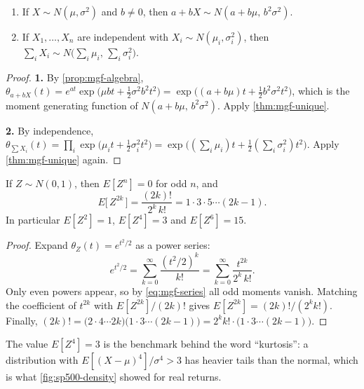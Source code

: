 \begin{corollary}\label{cor:normal-closure}
	\begin{enumerate}[nosep]
		\item If $X\sim N(\mu,\sigma^{2})$ and $b\ne0$, then $a+bX\sim N(a+b\mu,\,b^{2}\sigma^{2})$.
		\item If $X_{1},\dots,X_{n}$ are independent with $X_{i}\sim N(\mu_{i},\sigma_{i}^{2})$, then
		      $\sum_{i}X_{i}\sim N\bigl(\sum_{i}\mu_{i},\,\sum_{i}\sigma_{i}^{2}\bigr)$.
	\end{enumerate}
\end{corollary}

\begin{proof}
	\textbf{1.} By \autoref{prop:mgf-algebra},
	$\theta_{a+bX}(t)=e^{at}\exp\bigl(\mu bt+\tfrac12\sigma^{2}b^{2}t^{2}\bigr)=\exp\bigl((a+b\mu)t+\tfrac12 b^{2}\sigma^{2}t^{2}\bigr)$,
	which is the moment generating function of $N(a+b\mu,\,b^{2}\sigma^{2})$.
	Apply \autoref{thm:mgf-unique}.

	\textbf{2.} By independence,
	$\theta_{\sum X_{i}}(t)=\prod_{i}\exp\bigl(\mu_{i}t+\tfrac12\sigma_{i}^{2}t^{2}\bigr)=\exp\bigl((\sum_{i}\mu_{i})t+\tfrac12(\sum_{i}\sigma_{i}^{2})t^{2}\bigr)$.
	Apply \autoref{thm:mgf-unique} again.
\end{proof}

\begin{corollary}\label{cor:normal-moments}
	If $Z\sim N(0,1)$, then $E[Z^{n}]=0$ for odd $n$, and
	\[
		E\bigl[\,Z^{2k}\,\bigr] = \frac{(2k)!}{2^{k}\,k!} = 1\cdot3\cdot5\cdots(2k-1) .
	\]
	In particular $E[Z^{2}]=1$, $E[Z^{4}]=3$ and $E[Z^{6}]=15$.
\end{corollary}

\begin{proof}
	Expand $\theta_{Z}(t)=e^{t^{2}/2}$ as a power series:
	\[
		e^{t^{2}/2}=\sum_{k=0}^{\infty}\frac{(t^{2}/2)^{k}}{k!}=\sum_{k=0}^{\infty}\frac{t^{2k}}{2^{k}\,k!} .
	\]
	Only even powers appear, so by \eqref{eq:mgf-series} all odd moments vanish.
	Matching the coefficient of $t^{2k}$ with $E[Z^{2k}]/(2k)!$ gives $E[Z^{2k}]=(2k)!/(2^{k}k!)$.
	Finally, $(2k)!=\bigl(2\cdot4\cdots2k\bigr)\bigl(1\cdot3\cdots(2k-1)\bigr)=2^{k}k!\cdot\bigl(1\cdot3\cdots(2k-1)\bigr)$.
\end{proof}

The value $E[Z^{4}]=3$ is the benchmark behind the word ``kurtosis'': a distribution with $E[(X-\mu)^{4}]/\sigma^{4}>3$ has heavier tails than the normal, which is what \autoref{fig:sp500-density} showed for real returns.

